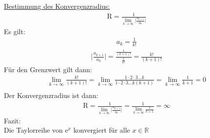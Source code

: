 \underline{Bestimmung des Konvergenzradius:}\\
\begin{align*}
	\mathrm{R}=\frac{1}{\lim\limits_ {k\to\infty}\big|\frac{a_{k+1}}{a_k}\big|}
\end{align*}
Es gilt:\\
\begin{align*}
	a_k=\frac{1}{k!}
\end{align*}
\begin{align*}
	\bigg|\frac{a_{k+1}}{a_k}\bigg|=\frac{\frac{1}{(k+1)!}}{\frac{1}{k!}}=\frac{k!}{(k+1)!}
\end{align*}
Für den Grenzwert gilt dann:\\
\begin{align*}
	\lim\limits_ {k\to\infty}\frac{k!}{(k+1)!}=\lim\limits_ {k\to\infty}\frac{1\cdot 2\cdot 3\dots k}{1\cdot 2\cdot 3\dots k(k+1)}=\lim\limits_ {k\to\infty}\frac{1}{k+1}=0\\
\end{align*}
Der Konvergenzradius ist dann:\\
\begin{align*}
	\mathrm{R}=\frac{1}{\lim\limits_ {k\to\infty}\big|\frac{a_{k+1}}{a_k}\big|}=\frac{1}{\lim\limits_ {k\to\infty}\frac{1}{k+1}}=\infty
\end{align*}
Fazit:\\
Die Taylorreihe von $ \mathrm{e}^x $ konvergiert für alle $ x\in\mathbb{R} $\\

































































